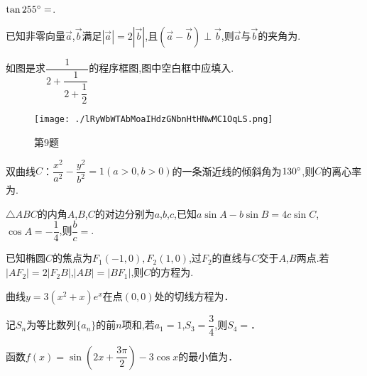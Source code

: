 \documentclass[list]{BHCexam}
\begin{document}
\begin{groups}
\begin{questions}[s]


\question[5] $\tan255^{\small \circ}=$.


\question[5]  已知非零向量$\vec{a}$,$\vec{b}$满足$|\overrightarrow{a}|=2|\overrightarrow{b}|$,且$(\overrightarrow{a}-\overrightarrow{b})\perp\overrightarrow{b}$,则$\overrightarrow{a}$与$\overrightarrow{b}$的夹角为.

\question[5] 如图是求$\dfrac{1}{2+\dfrac{1}{2+\dfrac{1}{2}}}$的程序框图,图中空白框中应填入.

\begin{figure}[H]
\centering
\texttt{[image: ./lRyWbWTAbMoaIHdzGNbnHtHNwMC1OqLS.png]}
\caption{第9题}
\end{figure}

\question[5] 双曲线$C$：$ \dfrac {x^{2}}{a^{2}} - \dfrac {y^{2}}{b^{2}} =1(a  \gt  0 , b  \gt  0)$的一条渐近线的倾斜角为$130^{\small \circ}$,则$C$的离心率为.

\question[5] $\triangle ABC$的内角$A$,$B$,$C$的对边分别为$a$,$b$,$c$,已知$a\sin A-b\sin B=4c\sin C$,$\cos A=- \dfrac {1}{4}$,则$ \dfrac {b}{c} =$.

\question[5] 已知椭圆$C$的焦点为${F}_{1}( - 1,0),{F}_{2}(1,0)$,过$F _{2}$的直线与$C$交于$A$,$B$两点$.$若$|A{F}_{2}|=2|{F}_{2}B|$,$|AB|=|B{F}_{1}|$,则$C$的方程为.
\end{questions}

\begin{questions}[s]

\question[5]  曲线$y=3(x ^{2} +x)e ^{x}$在点$(0 , 0)$处的切线方程为．

\question[5]  记$S _{n}$为等比数列$\{a _{n} \}$的前$n$项和,若$a _{1} =1$,$S _{3} = \dfrac{3}{4}$,则$S _{4} =$．

\question[5]  函数$f(x)=\sin(2x+ \dfrac{3\pi}{2} )-3\cos x$的最小值为．


\end{questions}
\end{groups}
\end{document}

